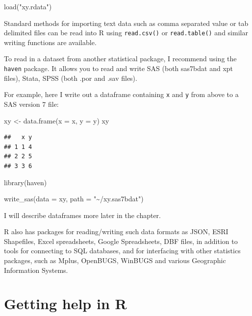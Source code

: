 \documentclass[
]{book}
\newenvironment{Shaded}{\begin{snugshade}}{\end{snugshade}}
\newcommand{\AttributeTok}[1]{\textcolor[rgb]{0.77,0.63,0.00}{#1}}
\newcommand{\FunctionTok}[1]{\textcolor[rgb]{0.00,0.00,0.00}{#1}}
\newcommand{\NormalTok}[1]{#1}
\newcommand{\OtherTok}[1]{\textcolor[rgb]{0.56,0.35,0.01}{#1}}
\newcommand{\StringTok}[1]{\textcolor[rgb]{0.31,0.60,0.02}{#1}}
\begin{document}
\begin{Shaded}
\begin{Highlighting}[]
\FunctionTok{load}\NormalTok{(}\StringTok{"xy.rdata"}\NormalTok{)}
\end{Highlighting}
\end{Shaded}

Standard methods for importing text data such as comma separated value
or tab delimited files can be read into R using \texttt{read.csv()} or
\texttt{read.table()} and similar writing functions are available.

To read in a dataset from another statistical package, I recommend using
the \texttt{haven} package. It allows you to read and write SAS (both sas7bdat
and xpt files), Stata, SPSS (both .por and .sav files).

For example, here I write out a dataframe containing \texttt{x} and \texttt{y} from
above to a SAS version 7 file:

\begin{Shaded}
\begin{Highlighting}[]
\NormalTok{xy }\OtherTok{\textless{}{-}} \FunctionTok{data.frame}\NormalTok{(}\AttributeTok{x =}\NormalTok{ x, }\AttributeTok{y =}\NormalTok{ y)}
\NormalTok{xy}
\end{Highlighting}
\end{Shaded}

\begin{verbatim}
##   x y
## 1 1 4
## 2 2 5
## 3 3 6
\end{verbatim}

\begin{Shaded}
\begin{Highlighting}[]
\FunctionTok{library}\NormalTok{(haven)}

\FunctionTok{write\_sas}\NormalTok{(}\AttributeTok{data =}\NormalTok{ xy,}
          \AttributeTok{path =} \StringTok{"\textasciitilde{}/xy.sas7bdat"}\NormalTok{)}
\end{Highlighting}
\end{Shaded}

I will describe dataframes more later in the chapter.

R also has packages for reading/writing such data formats as JSON, ESRI
Shapefiles, Excel spreadsheets, Google Spreadsheets, DBF files, in
addition to tools for connecting to SQL databases, and for interfacing
with other statistics packages, such as Mplus, OpenBUGS, WinBUGS and
various Geographic Information Systems.

\hypertarget{getting-help-in-r}{%
\section{Getting help in R}\label{getting-help-in-r}}
\end{document}
